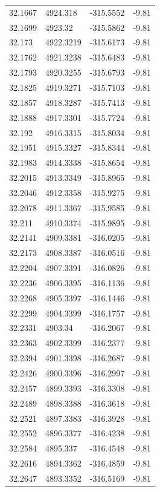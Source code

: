 \begin{table}[H]
\begin{tabular}{llll}
32.1667 & 4924.318 & -315.5552 & -9.81 \\
32.1699 & 4923.32 & -315.5862 & -9.81 \\
32.173 & 4922.3219 & -315.6173 & -9.81 \\
32.1762 & 4921.3238 & -315.6483 & -9.81 \\
32.1793 & 4920.3255 & -315.6793 & -9.81 \\
32.1825 & 4919.3271 & -315.7103 & -9.81 \\
32.1857 & 4918.3287 & -315.7413 & -9.81 \\
32.1888 & 4917.3301 & -315.7724 & -9.81 \\
32.192 & 4916.3315 & -315.8034 & -9.81 \\
32.1951 & 4915.3327 & -315.8344 & -9.81 \\
32.1983 & 4914.3338 & -315.8654 & -9.81 \\
32.2015 & 4913.3349 & -315.8965 & -9.81 \\
32.2046 & 4912.3358 & -315.9275 & -9.81 \\
32.2078 & 4911.3367 & -315.9585 & -9.81 \\
32.211 & 4910.3374 & -315.9895 & -9.81 \\
32.2141 & 4909.3381 & -316.0205 & -9.81 \\
32.2173 & 4908.3387 & -316.0516 & -9.81 \\
32.2204 & 4907.3391 & -316.0826 & -9.81 \\
32.2236 & 4906.3395 & -316.1136 & -9.81 \\
32.2268 & 4905.3397 & -316.1446 & -9.81 \\
32.2299 & 4904.3399 & -316.1757 & -9.81 \\
32.2331 & 4903.34 & -316.2067 & -9.81 \\
32.2363 & 4902.3399 & -316.2377 & -9.81 \\
32.2394 & 4901.3398 & -316.2687 & -9.81 \\
32.2426 & 4900.3396 & -316.2997 & -9.81 \\
32.2457 & 4899.3393 & -316.3308 & -9.81 \\
32.2489 & 4898.3388 & -316.3618 & -9.81 \\
32.2521 & 4897.3383 & -316.3928 & -9.81 \\
32.2552 & 4896.3377 & -316.4238 & -9.81 \\
32.2584 & 4895.337 & -316.4548 & -9.81 \\
32.2616 & 4894.3362 & -316.4859 & -9.81 \\
32.2647 & 4893.3352 & -316.5169 & -9.81 \\

\end{tabular}
\end{table}
